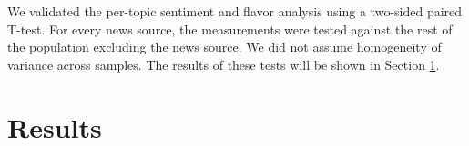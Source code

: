 \documentclass[final]{ieee}
\begin{document}
We validated the per-topic sentiment and flavor analysis using a two-sided paired T-test. For every news source, the measurements were tested against the rest of the population excluding the news source. We did not assume homogeneity of variance across samples. The results of these tests will be shown in Section \ref{sec:results}.


\section{Results}\label{sec:results}










\end{document}
